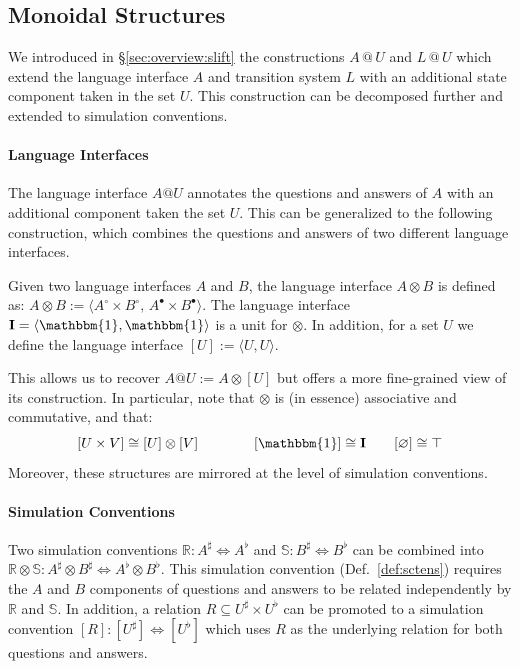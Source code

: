 \documentclass[acmsmall,screen,review,anonymous]{acmart}
\newcommand{\que}{\circ}
\newcommand{\ans}{\bullet}
\begin{document}


\subsection{Monoidal Structures} %

We introduced in \S\ref{sec:overview:slift}
the constructions $A \mathbin@ U$ and $L \mathbin@ U$
which extend the language interface $A$ and transition system $L$
with an additional state component taken in the set $U$.
This construction can be decomposed further
and extended to simulation conventions.

\paragraph{Language Interfaces} %

The language interface $A@U$
annotates the questions and answers of $A$
with an additional component taken the set $U$.
This can be generalized to the following construction,
which combines the questions and answers
of two different language interfaces.

\begin{definition}
Given two language interfaces $A$ and $B$,
the language interface $A \otimes B$ is defined as:
$
  A \otimes B :=
    \langle A^\que \times B^\que, \,
            A^\ans \times B^\ans \rangle
$.
The language interface
$\mathbf{I} = \langle \mathbbm{1}, \mathbbm{1} \rangle$
is a unit for $\otimes$.
In addition, for a set $U$
we define the language interface
$[U] := \langle U, U \rangle$.
\end{definition}

This allows us to recover
$A@U := A \otimes [U]$
but offers a more fine-grained view
of its construction.
In particular,
note that $\otimes$ is (in essence)
associative and commutative,
and that:
\[
  [U \times V] \cong [U] \otimes [V]
  \qquad \qquad
  [\mathbbm{1}] \cong \mathbf{I}
  \qquad
  [\varnothing] \cong \top
\]
Moreover,
these structures
are mirrored at the level of simulation conventions.


\paragraph{Simulation Conventions} %

Two simulation conventions
$\mathbb{R} : A^\sharp \Leftrightarrow A^\flat$ and
$\mathbb{S} : B^\sharp \Leftrightarrow B^\flat$
can be combined into %
$
  \mathbb{R} \otimes \mathbb{S} :
  A^\sharp \otimes B^\sharp \Leftrightarrow
  A^\flat \otimes B^\flat
$.
This simulation convention
(Def.~\ref{def:sctens})
requires the $A$ and $B$ components
of questions and answers
to be related independently by $\mathbb{R}$ and $\mathbb{S}$.
In addition,
a relation $R \subseteq U^\sharp \times U^\flat$
can be promoted to a simulation convention
$
  [R] : [U^\sharp] \Leftrightarrow [U^\flat]
$
which uses $R$ as the underlying relation for both
questions and answers.
\end{document}
